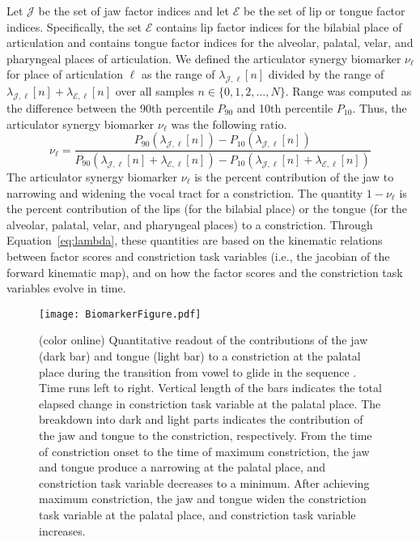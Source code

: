 \documentclass[reprint]{JASAnew}\usepackage[]{graphicx}\usepackage[]{color}
\begin{document}
Let $\mathcal{J}$ be the set of jaw factor indices and let $\mathcal{E}$ be the set of lip or tongue factor indices. Specifically, the set $\mathcal{E}$ contains lip factor indices for the bilabial place of articulation and contains tongue factor indices for the alveolar, palatal, velar, and pharyngeal places of articulation. 
%
We defined the articulator synergy biomarker $\nu_\ell$ for place of articulation $\ell$ as the range of $\lambda_{\mathcal{J},\ell} [ n ]$ divided by the range of $\lambda_{\mathcal{J},\ell} [ n ] + \lambda_{\mathcal{E},\ell} [ n ]$
over all samples $n \in \{0, 1, 2, \ldots, N\}$.
%
Range was computed as the difference between the 90th percentile $P_{90}$ and 10th percentile $P_{10}$. 
%
Thus, the articulator synergy biomarker $\nu_\ell$ was the following ratio.
\begin{equation}
\label{eq:nu}
\nu_\ell
=
\frac{P_{90}\left( \lambda_{\mathcal{J},\ell} [n] \right) - P_{10}\left( \lambda_{\mathcal{J},\ell} [n] \right)}
{P_{90}\left( \lambda_{\mathcal{J},\ell} [n] + \lambda_{\mathcal{E},\ell} [n] \right) - P_{10}\left( \lambda_{\mathcal{J},\ell} [n] + \lambda_{\mathcal{E},\ell} [n]\right)}
\end{equation}
%
The articulator synergy biomarker $\nu_\ell$ is the percent contribution of the jaw to narrowing and widening the vocal tract for a constriction. 
%
The quantity $1-\nu_\ell$ is the percent contribution of the lips (for the bilabial place) or the tongue (for the alveolar, palatal, velar, and pharyngeal places) to a constriction. 
%
Through Equation~\ref{eq:lambda}, these quantities are based on the kinematic relations between factor scores and constriction task variables (i.e., the jacobian of the forward kinematic map), and on how the factor scores and the constriction task variables evolve in time.


\begin{figure}

\texttt{[image: BiomarkerFigure.pdf]}

\caption{(color online) Quantitative readout of the contributions of the jaw (dark bar) and tongue (light bar) to a constriction at the palatal place during the transition from vowel \textipa{[a]} to glide \textipa{[j]} in the sequence \textipa{[aja]}. 
%
Time runs left to right.
%
Vertical length of the bars indicates the total elapsed change in constriction task variable at the palatal place.
%
The breakdown into dark and light parts indicates the contribution of the jaw and tongue to the constriction, respectively.
%
From the time of constriction onset to the time of maximum constriction, the jaw and tongue produce a narrowing at the palatal place, and constriction task variable decreases to a minimum. 
%
After achieving maximum constriction, the jaw and tongue widen the constriction task variable at the palatal place, and constriction task variable increases.}
\label{fig:biomarkerFigure}%
\end{figure}
\end{document}

